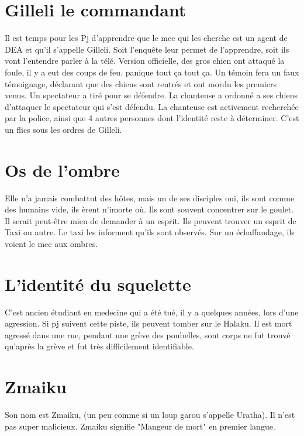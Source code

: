 \documentclass[oneside,12pt]{book}
\begin{document}
\begin{flushleft}
\section{Gilleli le commandant}
Il est temps pour les Pj d'apprendre que le mec qui les cherche est un agent de DEA et qu'il s'appelle Gilleli. Soit l'enquête leur permet de l'apprendre, soit ils vont l'entendre parler à la télé. Version officielle, des gros chien ont attaqué la foule, il y a eut des coups de feu. panique tout ça tout ça.
Un témoin fera un faux témoignage, déclarant que des chiens sont rentrés et ont mordu les premiers venus. Un spectateur a tiré pour se défendre. La chanteuse a ordonné a ses chiens d'attaquer le spectateur qui s'est défendu. La chanteuse est activement recherchée par la police, ainsi que 4 autres personnes dont l'identité reste à déterminer. C'est un flics sous les ordres de Gilleli.  

\section{Os de l'ombre}
Elle n'a jamais combattut des hôtes, mais un de ses disciples oui, ils sont comme des humains vide, ils èrent n'imorte où.
Ils sont souvent concentrer sur le goulet. Il serait peut-être mieu de demander à un esprit. 
Ils peuvent  trouver un esprit de Taxi ou autre. Le taxi les informent qu'ils sont observés. Sur un échaffaudage, ils voient le mec aux ombres.


\section{L'identité du squelette}
C'est ancien étudiant en medecine qui a été tué, il y a quelques années, lors d'une agression. Si pj suivent cette piste, ils peuvent tomber sur le Halaku.
Il est mort agressé dans une rue, pendant une grève des poubelles, sont corps ne fut trouvé qu'après la grève et fut très difficilement identifiable. 

\section{Zmaiku}
Son nom est Zmaiku, (un peu comme si un loup garou s'appelle Uratha).
Il n'est pas super malicieux. Zmaiku signifie "Mangeur de mort" en premier langue.



\end{flushleft}
\end{document}
